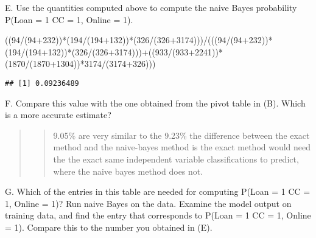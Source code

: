 \documentclass[
]{article}
\newenvironment{Shaded}{\begin{snugshade}}{\end{snugshade}}
\newcommand{\DecValTok}[1]{\textcolor[rgb]{0.00,0.00,0.81}{#1}}
\newcommand{\NormalTok}[1]{#1}
\newcommand{\SpecialCharTok}[1]{\textcolor[rgb]{0.00,0.00,0.00}{#1}}
\begin{document}
E. Use the quantities computed above to compute the naive Bayes
probability P(Loan = 1 \textbar{} CC = 1, Online = 1).

\begin{Shaded}
\begin{Highlighting}[]
\NormalTok{((}\DecValTok{94}\SpecialCharTok{/}\NormalTok{(}\DecValTok{94}\SpecialCharTok{+}\DecValTok{232}\NormalTok{))}\SpecialCharTok{*}\NormalTok{(}\DecValTok{194}\SpecialCharTok{/}\NormalTok{(}\DecValTok{194}\SpecialCharTok{+}\DecValTok{132}\NormalTok{))}\SpecialCharTok{*}\NormalTok{(}\DecValTok{326}\SpecialCharTok{/}\NormalTok{(}\DecValTok{326}\SpecialCharTok{+}\DecValTok{3174}\NormalTok{)))}\SpecialCharTok{/}\NormalTok{(((}\DecValTok{94}\SpecialCharTok{/}\NormalTok{(}\DecValTok{94}\SpecialCharTok{+}\DecValTok{232}\NormalTok{))}\SpecialCharTok{*}\NormalTok{(}\DecValTok{194}\SpecialCharTok{/}\NormalTok{(}\DecValTok{194}\SpecialCharTok{+}\DecValTok{132}\NormalTok{))}\SpecialCharTok{*}\NormalTok{(}\DecValTok{326}\SpecialCharTok{/}\NormalTok{(}\DecValTok{326}\SpecialCharTok{+}\DecValTok{3174}\NormalTok{)))}\SpecialCharTok{+}\NormalTok{((}\DecValTok{933}\SpecialCharTok{/}\NormalTok{(}\DecValTok{933}\SpecialCharTok{+}\DecValTok{2241}\NormalTok{))}\SpecialCharTok{*}\NormalTok{(}\DecValTok{1870}\SpecialCharTok{/}\NormalTok{(}\DecValTok{1870}\SpecialCharTok{+}\DecValTok{1304}\NormalTok{))}\SpecialCharTok{*}\DecValTok{3174}\SpecialCharTok{/}\NormalTok{(}\DecValTok{3174}\SpecialCharTok{+}\DecValTok{326}\NormalTok{)))}
\end{Highlighting}
\end{Shaded}

\begin{verbatim}
## [1] 0.09236489
\end{verbatim}

F. Compare this value with the one obtained from the pivot table in (B).
Which is a more accurate estimate?

\begin{quote}
\begin{quote}
9.05\% are very similar to the 9.23\% the difference between the exact
method and the naive-bayes method is the exact method would need the the
exact same independent variable classifications to predict, where the
naive bayes method does not.
\end{quote}
\end{quote}

G. Which of the entries in this table are needed for computing P(Loan =
1 \textbar{} CC = 1, Online = 1)? Run naive Bayes on the data. Examine
the model output on training data, and find the entry that corresponds
to P(Loan = 1 \textbar{} CC = 1, Online = 1). Compare this to the number
you obtained in (E).
\end{document}

